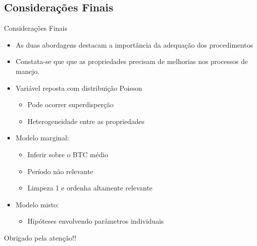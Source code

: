 \documentclass{beamer}
\begin{document}
\subsection{Considerações Finais}

\begin{frame}{Considerações Finais}
    \begin{itemize}
      \item As duas abordagens destacam a importância da adequação dos procedimentos
      \item Constata-se que que as propriedades precisam de melhorias nos processos de manejo.
      \item Variável reposta com distribuição Poisson
        \begin{itemize}  
          \item Pode ocorrer superdisperção
          \item Heterogeneidade entre as propriedades
        \end{itemize}
      \item Modelo marginal: 
        \begin{itemize}  
          \item Inferir sobre o BTC médio
          \item Período não relevante
          \item Limpeza 1 e ordenha altamente relevante
        \end{itemize}
      \item Modelo misto: 
        \begin{itemize}  
          \item Hipóteses envolvendo parâmetros individuais
        \end{itemize}

          
      


    \end{itemize}

\end{frame}


    
    

\begin{frame}
    \Huge{\centerline{Obrigado pela atenção!!}}
\end{frame}
\end{document}
